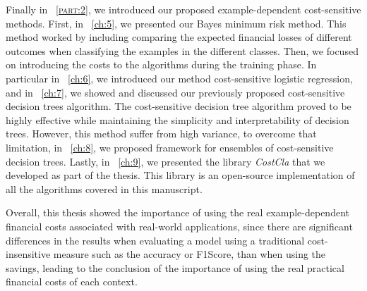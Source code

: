 Finally in \partname{~\textsc{\ref{part:2}}}, we introduced our proposed example-dependent 
cost-sensitive methods. First, in \chaptername{~\ref{ch:5}}, we presented our Bayes minimum risk 
method. This method worked by including comparing the expected financial losses of different 
outcomes when classifying the examples in the different classes. Then, we focused on introducing the 
costs to the algorithms during the training phase. In particular in \chaptername{~\ref{ch:6}}, we 
introduced our method cost-sensitive logistic regression, and in \chaptername{~\ref{ch:7}}, we 
showed and discussed our previously proposed cost-sensitive decision trees algorithm. 
The cost-sensitive decision tree algorithm proved to be highly effective while maintaining the 
simplicity and interpretability of decision trees. However, this method suffer from high variance, 
to overcome that limitation, in \chaptername{~\ref{ch:8}}, we proposed framework for 
ensembles of cost-sensitive decision trees. Lastly, in \chaptername{~\ref{ch:9}}, we presented the 
library \mbox{\textit{CostCla}} that we developed as part of the thesis. This library is an 
open-source implementation of all the algorithms covered in this manuscript.
  
Overall, this thesis showed the importance of using the real example-dependent financial 
costs associated with real-world applications, since there are significant differences in the 
results when evaluating a model using a traditional cost-insensitive measure such as the accuracy 
or F1Score,  than when using the savings, leading to the conclusion of the importance of using the 
real practical financial costs of each context.

  
